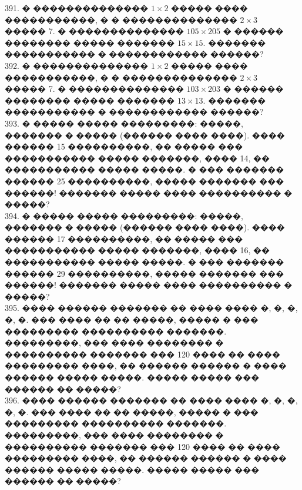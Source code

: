 \documentclass[12pt]{article}
\begin{document}
391. � �������������� $1\times2$ ����� ���� �����������, � � �������������� $2\times3$ ����� 7. � �������������� $105\times205$ � ������ ��������
����� ������� $15\times15.$ ������� ����������� � ������������ ������?\\
392. � �������������� $1\times2$ ����� ���� �����������, � � �������������� $2\times3$ ����� 7. � �������������� $103\times203$ � ������ ��������
����� ������� $13\times13.$ ������� ����������� � ������������ ������?\\
393. � ����� ����� ���������: �����, ������� � ����� (������ ���� ����). ���� ������ 15 ����������, �� ����� ��� ����������� ����� �������, ���� 14, �� ����������� ����� �����. � ��� ������� ������ 25 ����������, ����� ������� ��� ������! ������� ����� ���� ���������� � �����?\\
394. � ����� ����� ���������: �����, ������� � ����� (������ ���� ����). ���� ������ 17 ����������, �� ����� ��� ����������� ����� �������, ���� 16, �� ����������� ����� �����. � ��� ������� ������ 29 ����������, ����� ������� ��� ������! ������� ����� ���� ���������� � �����?\\
395. ���� ������ ������� �� ���� ���� �, �, �, �, �. ��� ���� �� �� �����, ����� � ��� ��������� ���������� �������. ���������, ��� ���� �������� � ���������� ������� ��� 120 ���� �� ���� ��������� ����, �� ������ ������ � ���� ������ ����� �����. ����� ����� ��� ������ �� �����?\\
396. ���� ������ ������� �� ���� ���� �, �, �, �, �. ��� ���� �� �� �����, ����� � ��� ��������� ���������� �������. ���������, ��� ���� �������� � ���������� ������� ��� 120 ���� �� ���� ��������� ����, �� ������ ������ � ���� ������ ����� �����. ����� ����� ��� ������ �� �����?
\end{document}
